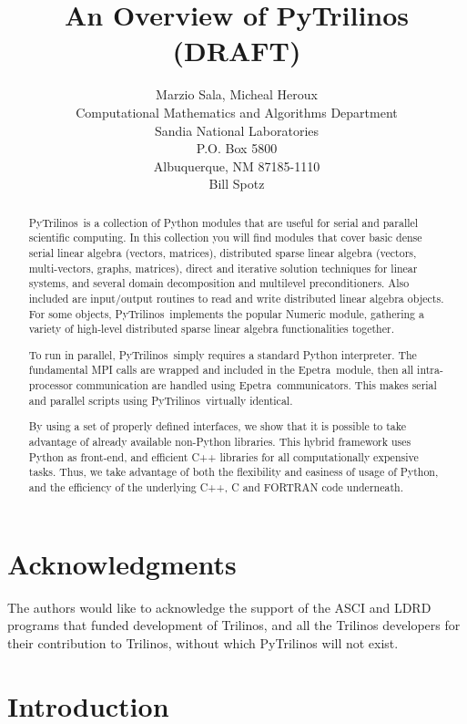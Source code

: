 \documentclass[10pt,relax]{SANDreport}
\author{Marzio Sala, Micheal Heroux\\
Computational Mathematics and Algorithms Department \\
Sandia National Laboratories \\
P.O. Box 5800 \\
Albuquerque, NM 87185-1110 \\[10pt]
Bill Spotz \\[10pt]
}
\title{An Overview of PyTrilinos (DRAFT)}
\newcommand{\PyTrilinos}{{PyTrilinos}}
\newcommand{\epetra}{{Epetra}}
\begin{document}
\maketitle

\begin{abstract}
\PyTrilinos\ is a collection of Python modules that are useful for serial and
parallel scientific
computing. In this collection you will find modules that cover basic
dense serial linear algebra (vectors, matrices), 
distributed sparse linear algebra (vectors, multi-vectors, graphs, matrices), 
direct and iterative solution techniques for linear systems, and several
domain decomposition and multilevel
preconditioners. Also included are input/output routines to read and write
distributed linear algebra objects.
For some objects, \PyTrilinos\ implements the popular Numeric module, gathering a variety of
high-level distributed sparse linear algebra functionalities together.

To run in parallel, \PyTrilinos\ simply requires a standard Python interpreter.
The fundamental MPI calls are wrapped and included in the \epetra\ module, then
all intra-processor communication are handled using \epetra\ communicators. This
makes serial and parallel scripts using \PyTrilinos\ virtually identical.

By using a set of properly defined interfaces, we show that it is possible to
take advantage of already available non-Python libraries. This hybrid framework
uses Python as front-end, and efficient C++ libraries for all computationally
expensive tasks. Thus, we take advantage of both the flexibility and easiness
of usage of Python, and the efficiency of the underlying C++, C and FORTRAN
code underneath. 
\end{abstract}

\clearpage
\section*{Acknowledgments}
The authors would like to acknowledge the support of the ASCI and LDRD
programs that funded development of Trilinos, and all the Trilinos developers
for their contribution to Trilinos, without which PyTrilinos will not exist.

\medskip

\SANDmain

\tableofcontents
\newpage

\section{Introduction}
\label{chap:introduction}
\end{document}
